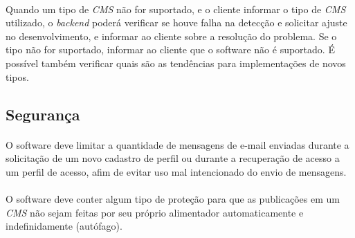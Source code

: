 \documentclass[a4paper,12pt]{article}
\def\blog{\emph{CMS}}
\begin{document}
\paragraph{}
Quando um tipo de \blog{} não for suportado, e o cliente informar o tipo de
\blog{} utilizado, o \emph{backend} poderá verificar se houve falha na detecção
e solicitar ajuste no desenvolvimento, e informar ao cliente sobre a resolução
do problema. Se o tipo não for suportado, informar ao cliente que o software
não é suportado. É possível também verificar quais são as tendências para
implementações de novos tipos.

\subsection{Segurança}

\paragraph{}
O software deve limitar a quantidade de mensagens de e-mail enviadas durante a
solicitação de um novo cadastro de perfil ou durante a recuperação de acesso a
um perfil de acesso, afim de evitar uso mal intencionado do envio de mensagens.

\paragraph{}
O software deve conter algum tipo de proteção para que as publicações em um
\blog{} não sejam feitas por seu próprio alimentador automaticamente e
indefinidamente (autófago).
\end{document}
